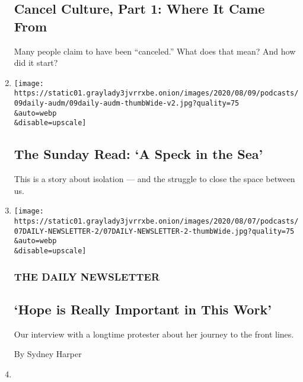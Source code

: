 \begin{enumerate}
  \hypertarget{cancel-culture-part-1-where-it-came-from}{%
  \subsection{Cancel Culture, Part 1: Where It Came
  From}\label{cancel-culture-part-1-where-it-came-from}}

  Many people claim to have been ``canceled.'' What does that mean? And
  how did it start?
\item
  \href{/2020/08/09/podcasts/the-daily/quarantine-isolation.html}{}

  \texttt{[image: https://static01.graylady3jvrrxbe.onion/images/2020/08/09/podcasts/09daily-audm/09daily-audm-thumbWide-v2.jpg?quality=75\\\&auto=webp\\\&disable=upscale]}

  \hypertarget{the-sunday-read-a-speck-in-the-sea}{%
  \subsection{The Sunday Read: `A Speck in the
  Sea'}\label{the-sunday-read-a-speck-in-the-sea}}

  This is a story about isolation --- and the struggle to close the
  space between us.
\item
  \href{/2020/08/07/podcasts/daily-newsletter-black-lives-matter-protests.html}{}

  \texttt{[image: https://static01.graylady3jvrrxbe.onion/images/2020/08/07/podcasts/07DAILY-NEWSLETTER-2/07DAILY-NEWSLETTER-2-thumbWide.jpg?quality=75\\\&auto=webp\\\&disable=upscale]}

  \hypertarget{the-daily-newsletter-1}{%
  \subsubsection{THE DAILY NEWSLETTER}\label{the-daily-newsletter-1}}

  \hypertarget{hope-is-really-important-in-this-work}{%
  \subsection{`Hope is Really Important in This
  Work'}\label{hope-is-really-important-in-this-work}}

  Our interview with a longtime protester about her journey to the front
  lines.

  By Sydney Harper
\item
  \href{/2020/08/07/podcasts/the-daily/Jack-dorsey-twitter-trump.html}{}


\end{enumerate}
